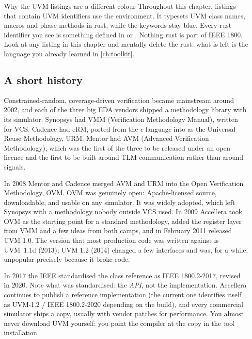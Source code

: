 \begin{notebox}{Why the UVM listings are a different colour}
Throughout this chapter, listings that contain UVM identifiers use the
 environment. It typesets UVM class names, macros and phase
methods in rust, while the \SV{} keywords stay blue. Every rust identifier
you see is something defined in  or
. Nothing rust is part of IEEE 1800. Look at any
listing in this chapter and mentally delete the rust: what is left is the
language you already learned in \cref{ch:toolkit}.
\end{notebox}

\subsection{A short history}
\label{sec:uvm:history}

%
Constrained-random, coverage-driven verification became mainstream around
2002, and each of the three big EDA vendors shipped a methodology library with
its simulator. Synopsys had VMM (Verification Methodology Manual), written
for VCS. Cadence had eRM, ported from the \emph{e} language into \SV{} as the
Universal Reuse Methodology, URM. Mentor had AVM (Advanced Verification
Methodology), which was the first of the three to be released under an open
licence and the first to be built around TLM communication rather than around
signals.

%
In 2008 Mentor and Cadence merged AVM and URM into the Open Verification
Methodology, OVM. OVM was genuinely open: Apache-licensed source, downloadable,
and usable on any simulator. It was widely adopted, which left Synopsys with a
methodology nobody outside VCS used. In 2009 Accellera took OVM as the
starting point for a standard methodology, added the register layer from VMM
and a few ideas from both camps, and in February 2011 released UVM 1.0. The
version that most production code was written against is UVM~1.1d (2013); UVM
1.2 (2014) changed a few interfaces and was, for a while, unpopular precisely
because it broke code.

%
In 2017 the IEEE standardised the class reference as IEEE 1800.2-2017,
revised in 2020. Note what was standardised: the \emph{API}, not the
implementation. Accellera continues to publish a reference implementation
(the current one identifies itself as UVM-1.2 / IEEE 1800.2-2020 depending on
the build), and every commercial simulator ships a copy, usually with vendor
patches for performance. You almost never download UVM yourself: you point
the compiler at the copy in the tool installation.

